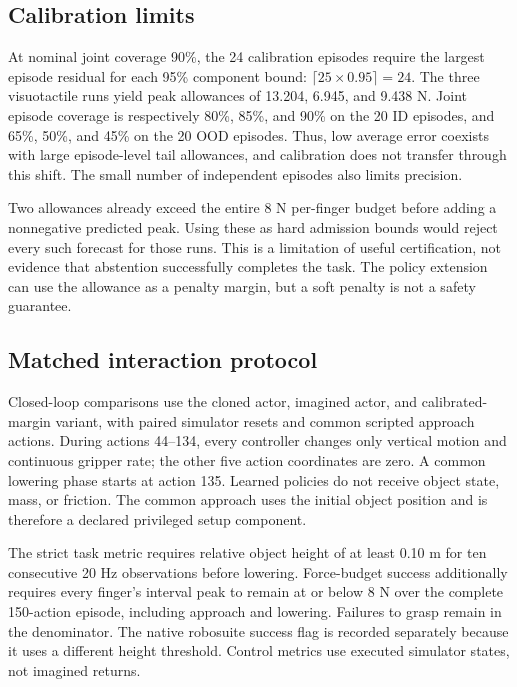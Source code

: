 \documentclass[letterpaper,10pt,conference]{ieeeconf}
\begin{document}
\subsection{Calibration limits}

At nominal joint coverage 90\%, the 24 calibration episodes require the largest episode residual for each 95\% component bound: $\lceil25\times0.95\rceil=24$. The three visuotactile runs yield peak allowances of 13.204, 6.945, and 9.438 N. Joint episode coverage is respectively 80\%, 85\%, and 90\% on the 20 ID episodes, and 65\%, 50\%, and 45\% on the 20 OOD episodes. Thus, low average error coexists with large episode-level tail allowances, and calibration does not transfer through this shift. The small number of independent episodes also limits precision.

Two allowances already exceed the entire 8 N per-finger budget before adding a nonnegative predicted peak. Using these as hard admission bounds would reject every such forecast for those runs. This is a limitation of useful certification, not evidence that abstention successfully completes the task. The policy extension can use the allowance as a penalty margin, but a soft penalty is not a safety guarantee.

\subsection{Matched interaction protocol}

Closed-loop comparisons use the cloned actor, imagined actor, and calibrated-margin variant, with paired simulator resets and common scripted approach actions. During actions 44--134, every controller changes only vertical motion and continuous gripper rate; the other five action coordinates are zero. A common lowering phase starts at action 135. Learned policies do not receive object state, mass, or friction. The common approach uses the initial object position and is therefore a declared privileged setup component.

The strict task metric requires relative object height of at least 0.10 m for ten consecutive 20 Hz observations before lowering. Force-budget success additionally requires every finger's interval peak to remain at or below 8 N over the complete 150-action episode, including approach and lowering. Failures to grasp remain in the denominator. The native robosuite success flag is recorded separately because it uses a different height threshold. Control metrics use executed simulator states, not imagined returns.
\end{document}
